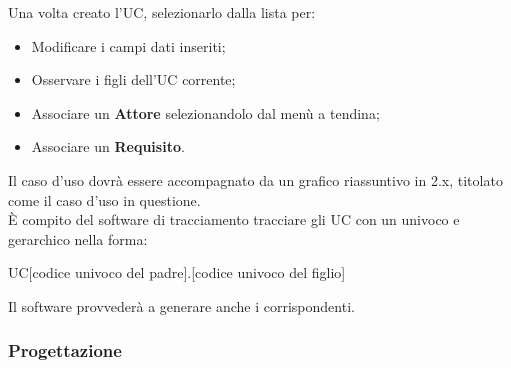       Una volta creato l'UC, selezionarlo dalla lista per:
      \begin{itemize}
        \item Modificare i campi dati inseriti;
        \item Osservare i figli dell'UC corrente;
        \item Associare un \textbf{Attore} selezionandolo dal menù a tendina;
        \item Associare un \textbf{Requisito}.
      \end{itemize}
      Il caso d'uso dovrà essere accompagnato da un grafico riassuntivo in 2.x, titolato come il caso d'uso in questione.\\
      È compito del software di tracciamento tracciare gli UC con un  univoco e gerarchico nella forma:
      \begin{center}
        UC[codice univoco del padre].[codice univoco del figlio]
      \end{center}
      Il software provvederà a generare anche i   corrispondenti.
\subsubsection{Progettazione}
